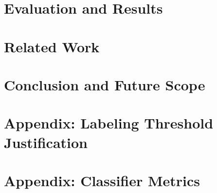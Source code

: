 \cleardoublepage
\ifodd\value{page}\null\thispagestyle{empty}\newpage\fi
\chapter{Evaluation and Results} \label{Evaluation and Results}


\cleardoublepage
\chapter{Related Work} \label{Related work}


\cleardoublepage
\chapter{Conclusion and Future Scope} \label{Conclusion and Future Scope}


\cleardoublepage
\printbibliography[heading=bibintoc]
\markboth{}{} %

\cleardoublepage
\appendix

\renewcommand{\thefigure}{\Alph{chapter}.\arabic{figure}}
\renewcommand{\thetable}{\Alph{chapter}.\arabic{table}}

\renewcommand{\thechapter}{A}
\chapter*{Appendix: Labeling Threshold Justification}
\label{appendix:labeling}


\renewcommand{\thechapter}{B}
\chapter*{Appendix: Classifier Metrics}
\label{appendix:classifier}


